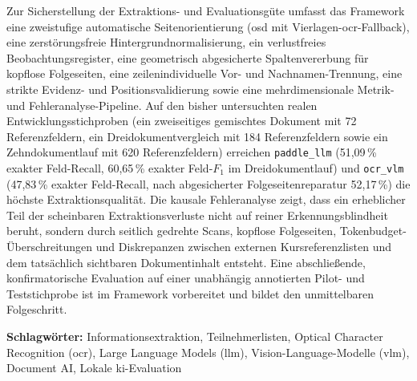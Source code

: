 Zur Sicherstellung der Extraktions- und Evaluationsgüte umfasst das Framework eine zweistufige automatische Seitenorientierung (\ac{osd} mit Vierlagen-\acs{ocr}-Fallback), eine zerstörungsfreie Hintergrundnormalisierung, ein verlustfreies Beobachtungsregister, eine geometrisch abgesicherte Spaltenvererbung für kopflose Folgeseiten, eine zeilenindividuelle Vor- und Nachnamen-Trennung, eine strikte Evidenz- und Positionsvalidierung sowie eine mehrdimensionale Metrik- und Fehleranalyse-Pipeline. Auf den bisher untersuchten realen Entwicklungsstichproben (ein zweiseitiges gemischtes Dokument mit 72 Referenzfeldern, ein Dreidokumentvergleich mit 184 Referenzfeldern sowie ein Zehndokumentlauf mit 620 Referenzfeldern) erreichen \texttt{paddle\_llm} (51,09\,\% exakter Feld-Recall, 60,65\,\% exakter Feld-$F_1$ im Dreidokumentlauf) und \texttt{ocr\_vlm} (47,83\,\% exakter Feld-Recall, nach abgesicherter Folgeseitenreparatur 52,17\,\%) die höchste Extraktionsqualität. Die kausale Fehleranalyse zeigt, dass ein erheblicher Teil der scheinbaren Extraktionsverluste nicht auf reiner Erkennungsblindheit beruht, sondern durch seitlich gedrehte Scans, kopflose Folgeseiten, Tokenbudget-Überschreitungen und Diskrepanzen zwischen externen Kursreferenzlisten und dem tatsächlich sichtbaren Dokumentinhalt entsteht. Eine abschließende, konfirmatorische Evaluation auf einer unabhängig annotierten Pilot- und Teststichprobe ist im Framework vorbereitet und bildet den unmittelbaren Folgeschritt.

\textbf{Schlagwörter:} Informationsextraktion, Teilnehmerlisten, Optical Character Recognition (\acs{ocr}), Large Language Models (\acs{llm}), Vision-Language-Modelle (\acs{vlm}), Document AI, Lokale \acs{ki}-Evaluation
